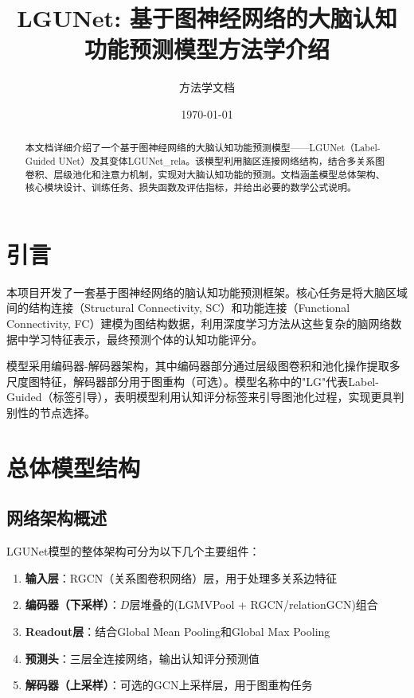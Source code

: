 \documentclass[UTF8, a4paper, 12pt]{article}
\title{LGUNet: 基于图神经网络的大脑认知功能预测模型方法学介绍}
\author{方法学文档}
\date{\today}
\begin{document}
\maketitle

\begin{abstract}
本文档详细介绍了一个基于图神经网络的大脑认知功能预测模型——LGUNet（Label-Guided UNet）及其变体LGUNet\_rela。该模型利用脑区连接网络结构，结合多关系图卷积、层级池化和注意力机制，实现对大脑认知功能的预测。文档涵盖模型总体架构、核心模块设计、训练任务、损失函数及评估指标，并给出必要的数学公式说明。
\end{abstract}

\newpage

\section{引言}

本项目开发了一套基于图神经网络的脑认知功能预测框架。核心任务是将大脑区域间的结构连接（Structural Connectivity, SC）和功能连接（Functional Connectivity, FC）建模为图结构数据，利用深度学习方法从这些复杂的脑网络数据中学习特征表示，最终预测个体的认知功能评分。

模型采用编码器-解码器架构，其中编码器部分通过层级图卷积和池化操作提取多尺度图特征，解码器部分用于图重构（可选）。模型名称中的"LG"代表Label-Guided（标签引导），表明模型利用认知评分标签来引导图池化过程，实现更具判别性的节点选择。

\newpage

\section{总体模型结构}

\subsection{网络架构概述}

LGUNet模型的整体架构可分为以下几个主要组件：

\begin{enumerate}
    \item \textbf{输入层}：RGCN（关系图卷积网络）层，用于处理多关系边特征
    \item \textbf{编码器（下采样）}：$D$层堆叠的(LGMVPool + RGCN/relationGCN)组合
    \item \textbf{Readout层}：结合Global Mean Pooling和Global Max Pooling
    \item \textbf{预测头}：三层全连接网络，输出认知评分预测值
    \item \textbf{解码器（上采样）}：可选的GCN上采样层，用于图重构任务
\end{enumerate}
\end{document}
